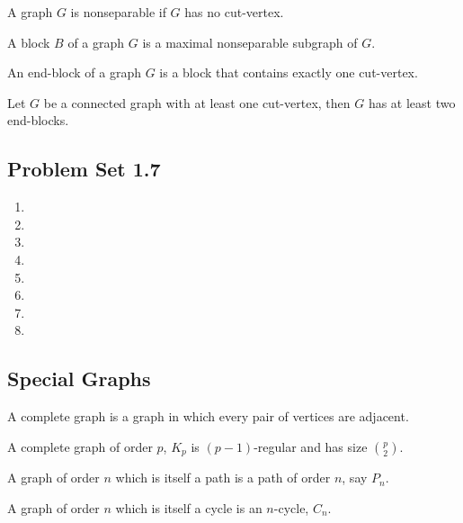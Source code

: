 \begin{definition}
	A graph $G$ is nonseparable if $G$ has no cut-vertex.
\end{definition}
\begin{definition}
	A block $B$ of a graph $G$ is a maximal nonseparable subgraph of $G$.
\end{definition}

\begin{definition}
	An end-block of a graph $G$ is a block that contains exactly one cut-vertex.
\end{definition}

\begin{theorem}
	Let $G$ be a connected graph with at least one cut-vertex, then $G$ has at least two end-blocks.
\end{theorem}
\subsection*{Problem Set 1.7}
\begin{enumerate}
	\item
	\item
	\item
	\item
	\item
	\item
	\item
	\item
\end{enumerate}

\subsection{Special Graphs}
\begin{definition}
	A complete graph is a graph in which every pair of vertices are adjacent.
\end{definition}
\begin{remark}
	A complete graph of order $p$, $K_p$ is $(p-1)$-regular and has size $\binom{p}{2}$.
\end{remark}

\begin{definition}
	A graph of order $n$ which is itself a path is a path of order $n$, say $P_n$.
\end{definition}

\begin{definition}
	A graph of order $n$ which is itself a cycle is an  $n$-cycle, $C_n$.
\end{definition}

